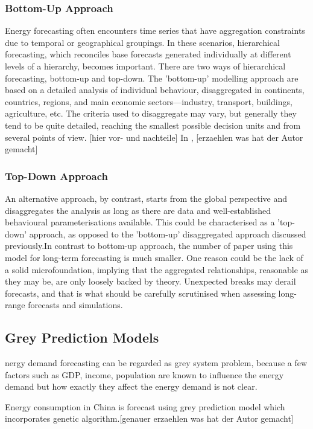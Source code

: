 \documentclass[lettersize,journal]{IEEEtran}
\begin{document}
    \subsubsection{Bottom-Up Approach}
  Energy forecasting often encounters time series that have aggregation constraints due to temporal or geographical groupings. In these scenarios, hierarchical forecasting, which reconciles base forecasts generated individually at different levels of a hierarchy, becomes important. There are two ways of hierarchical forecasting, bottom-up and top-down. The 'bottom-up' modelling approach are based on a detailed analysis of individual behaviour, disaggregated in continents, countries, regions, and main economic sectors—industry, transport, buildings, agriculture, etc. The criteria used to disaggregate may vary, but generally they tend to be quite detailed, reaching the smallest possible decision units and from several points of view. [hier vor- und nachteile]  In \cite{9}, [erzaehlen was hat der Autor gemacht]

    \subsubsection{Top-Down Approach}
  An alternative approach, by contrast, starts from the global perspective and disaggregates the analysis as long as there are data and well-established behavioural parameterisations available. This could be characterised as a 'top-down' approach, as opposed to the 'bottom-up' disaggregated approach discussed previously.In contrast to bottom-up approach, the number of paper using this model for long-term forecasting is much smaller. One reason could be the lack of a solid microfoundation, implying that the aggregated relationships, reasonable as they may be, are only loosely backed by theory. Unexpected breaks may derail forecasts, and that is what should be carefully scrutinised when assessing long-range forecasts and simulations.

  
  \subsection{Grey Prediction Models}
  nergy demand forecasting can be regarded as grey system problem, because a few factors such as GDP, income, population are known to influence the energy demand but how exactly they affect the energy demand is not clear.

  Energy consumption in China is forecast using grey prediction model which incorporates genetic algorithm\cite{272}.[genauer erzaehlen was hat der Autor gemacht]
\end{document}
